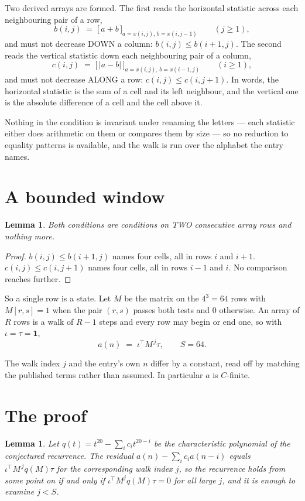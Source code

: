 \documentclass[11pt,a4paper]{article}
\theoremstyle{plain}
\newtheorem{lemma}[theorem]{Lemma}
\theoremstyle{definition}
\begin{document}
Two derived arrays are formed. The first reads the horizontal statistic across each
neighbouring pair of a row,
\[
b(i,j)\;=\;\bigl[\,a+b\,\bigr]_{a=x(i,j),\,b=x(i,j-1)}\qquad (j\ge1),
\]
and must not decrease DOWN a column: $b(i,j)\le b(i{+}1,j)$. The second reads the vertical
statistic down each neighbouring pair of a column,
\[
c(i,j)\;=\;\bigl[\,\lvert a-b\rvert\,\bigr]_{a=x(i,j),\,b=x(i{-}1,j)}\qquad (i\ge1),
\]
and must not decrease ALONG a row: $c(i,j)\le c(i,j{+}1)$. In words, the horizontal statistic
is the sum of a cell and its left neighbour, and the vertical one is
the absolute difference of a cell and the cell above it.

Nothing in the condition is invariant under renaming the letters --- each statistic either does
arithmetic on them or compares them by size --- so no reduction to equality patterns is
available, and the walk is run over the alphabet the entry names.

\section{A bounded window}

\begin{lemma}\label{lem:win}
Both conditions are conditions on TWO consecutive array rows and nothing more.
\end{lemma}

\begin{proof}
$b(i,j)\le b(i{+}1,j)$ names four cells, all in rows $i$ and $i+1$. $c(i,j)\le c(i,j{+}1)$
names four cells, all in rows $i-1$ and $i$. No comparison reaches further.
\end{proof}

So a single row is a state. Let $M$ be the matrix on the $4^{3}=64$ rows with
$M[r,s]=1$ when the pair $(r,s)$ passes both tests and $0$ otherwise. An array of $R$ rows is a
walk of $R-1$ steps and every row may begin or end one, so with $\iota=\tau=\mathbf{1}$,
\[
a(n)\;=\;\iota^{\!\top}M^{\,j}\tau ,\qquad S=64.
\]

The walk index $j$ and the entry's own $n$ differ by a constant, read off by matching the
published terms rather than assumed. In particular $a$ is $C$-finite.

\section{The proof}

\begin{lemma}\label{lem:crit}
Let $q(t)=t^{20}-\sum_i c_it^{20-i}$ be the characteristic polynomial of the
conjectured recurrence. The residual $a(n)-\sum_ic_ia(n-i)$ equals
$\iota^{\!\top}M^{\,j}q(M)\tau$ for the corresponding walk index $j$, so the recurrence
holds from some point on if and only if $\iota^{\!\top}M^{j}q(M)\tau=0$ for all large $j$,
and it is enough to examine $j<S$.
\end{lemma}
\end{document}
